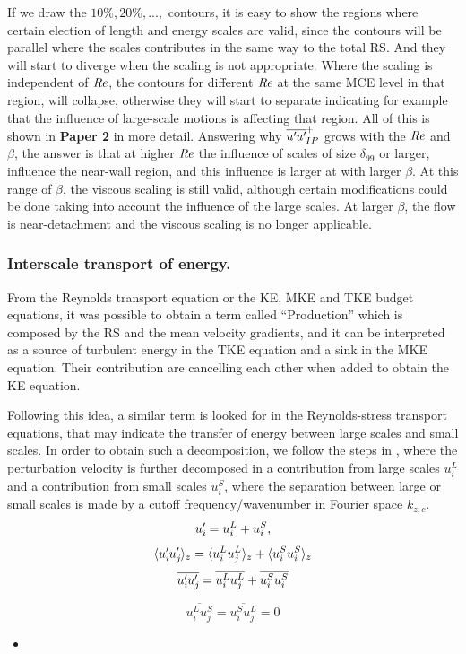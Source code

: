 If we draw the $10\%, 20\%,...,$ contours, it is easy to show the regions where certain election of length and energy scales are valid, since the contours will be parallel where the scales contributes in the same way to the total RS. And they will start to diverge when the scaling is not appropriate.
Where the scaling is independent of $\mbox{\textit{Re}}$, the contours for different $\mbox{\textit{Re}}$ at the same MCE level in that region, will collapse, otherwise they will start to separate indicating for example that the influence of large-scale motions is affecting that region.
All of this is shown in \textbf{Paper 2} in more detail.
Answering why $\overline{u^{\prime}\mkern-1.2mu u^{\prime}\mkern-1.2mu}_{IP}^+$ grows with the $\mbox{\textit{Re}}$ and $\beta$, the answer is that at higher $\mbox{\textit{Re}}$ the influence of scales of size $\delta_{99}$ or larger, influence the near-wall region, and this influence is larger at with larger $\beta$. At this range of $\beta$, the viscous scaling is still valid, although certain modifications could be done taking into account the influence of the large scales.
At larger $\beta$, the flow is near-detachment and the viscous scaling is no longer applicable.


\subsubsection{Interscale transport of energy.}

From the Reynolds transport equation or the KE, MKE and TKE budget equations, it was possible to obtain a term called ``Production'' which is composed by the RS and the mean velocity gradients, and it can be interpreted as a source of turbulent energy in the TKE equation and a sink in the MKE equation. Their contribution are cancelling each other when added to obtain the KE equation.

Following this idea, a similar term is looked for in the Reynolds-stress transport equations, that may indicate the transfer of energy between large scales and small scales.
In order to obtain such a decomposition, we follow the steps in \cite{PRL2018_Kawata, JFM2019_kawata_alfredsson}, where the perturbation velocity is further decomposed in a contribution from large scales $u_i^L$ and a contribution from small scales $u_i^S$, where the separation between large or small scales is made by a cutoff frequency/wavenumber in Fourier space $k_{z,c}$.
\begin{equation}
    \label{eq:intersc_decomp}
    u_i^{\prime}\mkern-1.2mu = u_i^L + u_i^S,
\end{equation}
\begin{equation}
    \label{eq:intersc_decomp}
    \langle u_i^{\prime}\mkern-1.2mu u_j^{\prime}\mkern-1.2mu \rangle_z = 
    \langle u_i^L u_j^L \rangle_z + 
    \langle u_i^S u_i^S \rangle_z
\end{equation}
\begin{equation}
    \label{eq:intersc_decomp}
    \overline{u_i^{\prime}\mkern-1.2mu u_j^{\prime}\mkern-1.2mu} = 
    \overline{ u_i^L u_j^L} + 
    \overline{ u_i^S u_i^S}
\end{equation}

\begin{equation}
    \label{eq:intersc_decomp}
    \overline{ u_i^L u_j^S} = 
    \overline{ u_i^S u_j^L} = 0
\end{equation}



\begin{itemize}
    \item 
\end{itemize}